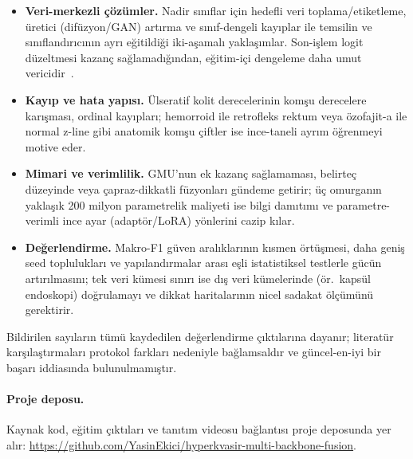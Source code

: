 \begin{itemize}
  \item \textbf{Veri-merkezli çözümler.} Nadir sınıflar için hedefli veri
        toplama/etiketleme, üretici (difüzyon/GAN) artırma ve sınıf-dengeli
        kayıplar ile temsilin ve sınıflandırıcının ayrı eğitildiği iki-aşamalı
        yaklaşımlar. Son-işlem logit düzeltmesi kazanç sağlamadığından,
        eğitim-içi dengeleme daha umut vericidir~\cite{lin2017focal}.
  \item \textbf{Kayıp ve hata yapısı.} Ülseratif kolit derecelerinin komşu
        derecelere karışması, ordinal kayıpları; hemorroid ile retrofleks rektum
        veya özofajit-a ile normal z-line gibi anatomik komşu çiftler ise
        ince-taneli ayrım öğrenmeyi motive eder.
  \item \textbf{Mimari ve verimlilik.} GMU'nun ek kazanç sağlamaması, belirteç
        düzeyinde veya çapraz-dikkatli füzyonları gündeme getirir; üç omurganın
        yaklaşık 200 milyon parametrelik maliyeti ise bilgi damıtımı ve
        parametre-verimli ince ayar (adaptör/LoRA) yönlerini cazip kılar.
  \item \textbf{Değerlendirme.} Makro-F1 güven aralıklarının kısmen örtüşmesi,
        daha geniş seed toplulukları ve yapılandırmalar arası eşli istatistiksel
        testlerle gücün artırılmasını; tek veri kümesi sınırı ise dış veri
        kümelerinde (ör.\ kapsül endoskopi) doğrulamayı ve dikkat haritalarının
        nicel sadakat ölçümünü gerektirir.
\end{itemize}

Bildirilen sayıların tümü kaydedilen değerlendirme çıktılarına dayanır; literatür
karşılaştırmaları protokol farkları nedeniyle bağlamsaldır ve güncel-en-iyi bir
başarı iddiasında bulunulmamıştır.

\paragraph{Proje deposu.} Kaynak kod, eğitim çıktıları ve tanıtım videosu
bağlantısı proje deposunda yer alır:
\url{https://github.com/YasinEkici/hyperkvasir-multi-backbone-fusion}.
